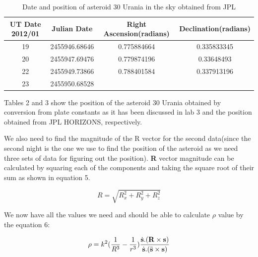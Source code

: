 \documentclass[letterpaper,12pt]{article}
\begin{document}
\FloatBarrier
\begin{table}[h!]
\caption{Date and position of asteroid 30 Urania in the sky obtained from JPL} %
\centering %
\begin{tabular}{| c | c | c | c |} %
\hline %
UT Date 2012/01 & Julian Date & Right Ascension(radians) & Declination(radians) \\ [0.5ex] %
\hline %
19   &   2455946.68646  & 0.775884664&   0.335833345 \\ \hline
20   &   2455947.69476  & 0.779874196  & 0.33648493   \\ \hline
22   &   2455949.73866 &  0.788401584 & 0.337913196    \\  \hline
23   &   2455950.68528  &  &     \\ [1ex] %
\hline %
\end{tabular}
\label{table:nonlin} %
\end{table}
\FloatBarrier

Tables 2 and 3 show the position of the asteroid 30 Urania obtained by conversion from plate constants as it has been discussed in lab 3 and the position obtained from JPL HORIZONS, respectively.

We also need to find the magnitude of the R vector for the second data(since the second night is the one we use to find the position of the asteroid as we need three sets of data for figuring out the position). {\bf R} vector magnitude can be calculated by squaring each of the components and taking the square root of their sum as shown in equation 5.

\begin{equation}
R=\sqrt{R_{x}^2+R_{y}^2+R_{z}^2}
\end{equation}


We now have all the values we need and should be able to calculate \begin{math} \rho \end{math} value by the equation 6:

\begin{equation}
\rho=k^2(\frac{1}{R^3}-\frac{1}{r^3})\frac{\dot{{\bf s}}.({\bf R}\times{\bf s})}{\dot{{\bf s}}.(\ddot{{\bf s}}\times{\bf s})}
\end{equation}
\end{document}

